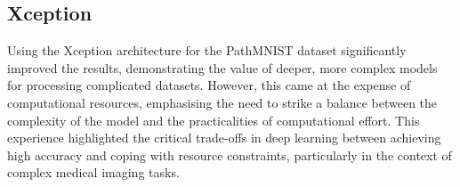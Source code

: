 \subsection{Xception}\label{XceptionDiscussion}
Using the Xception architecture for the PathMNIST dataset significantly improved the results, demonstrating the value of deeper, more complex models for processing complicated datasets. However, this came at the expense of computational resources, emphasising the need to strike a balance between the complexity of the model and the practicalities of computational effort. This experience highlighted the critical trade-offs in deep learning between achieving high accuracy and coping with resource constraints, particularly in the context of complex medical imaging tasks.